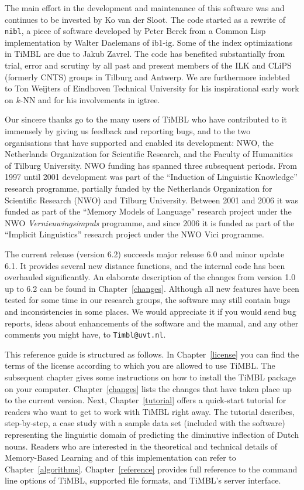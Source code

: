 \documentclass{report}
\begin{document}
The main effort in the development and maintenance of this software was and continues to be invested by Ko van der Sloot. The code started as a rewrite of {\tt nibl}, a piece of software developed by Peter Berck from a Common Lisp implementation by Walter Daelemans of {\sc ib1-ig}. Some of the index optimizations in TiMBL are due to Jakub Zavrel. The code has benefited substantially from trial, error and scrutiny by all past and present members of the ILK and CLiPS (formerly CNTS) groups in Tilburg and Antwerp. We are furthermore indebted to Ton Weijters of Eindhoven Technical University for his inspirational early work on $k$-NN and for his involvements in {\sc igtree}.

Our sincere thanks go to the many users of TiMBL who have contributed to it immensely by giving us feedback and reporting bugs, and to the two organisations that have supported and enabled its development: NWO, the Netherlands Organization for Scientific Research, and the Faculty of Humanities of Tilburg University. NWO funding has spanned three subsequent periods. From 1997 until 2001 development was part of the ``Induction of Linguistic Knowledge'' research programme, partially funded by the Netherlands Organization for Scientific Research (NWO) and Tilburg University. Between 2001 and 2006 it was funded as part of the ``Memory Models of Language'' research project under the NWO {\em Vernieuwingsimpuls}\/ programme, and since 2006 it is funded as part of the ``Implicit Linguistics'' research project under the NWO Vici programme.

The current release (version 6.2) succeeds major release 6.0 and minor update 6.1. It provides several new distance functions, and the internal code has been overhauled significantly. An elaborate description of the changes from version 1.0 up to 6.2 can be found in Chapter~\ref{changes}. Although all new features have been tested for some time in our research groups, the software may still contain bugs and inconsistencies in some places. We would appreciate it if you would send bug reports, ideas about enhancements of the software and the manual, and any other comments you might have, to {\tt Timbl@uvt.nl}.

This reference guide is structured as follows. In Chapter~\ref{license} you can find the terms of the license according to which you are allowed to use TiMBL. The subsequent chapter gives some instructions on how to install the TiMBL package on your computer. Chapter~\ref{changes} lists the changes that have taken place up to the current version. Next, Chapter~\ref{tutorial} offers a quick-start tutorial for readers who want to get to work with TiMBL right away. The tutorial describes, step-by-step, a case study with a sample data set (included with the software) representing the linguistic domain of predicting the diminutive inflection of Dutch nouns.  Readers who are interested in the theoretical and technical details of Memory-Based Learning and of this implementation can refer to Chapter~\ref{algorithms}. Chapter~\ref{reference} provides full reference to the command line options of TiMBL, supported file formats, and TiMBL's server interface.
\end{document}
